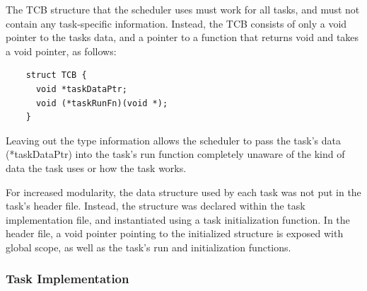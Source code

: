 \documentclass[12pt]{article} %
\begin{document}
    The TCB structure that the scheduler uses must work for all tasks, and must not
    contain any task-specific information. Instead, the TCB consists of only a void pointer to the tasks data, and a pointer to a function that returns void and takes a void pointer, as follows:
    \begin{lstlisting}
    struct TCB {
      void *taskDataPtr;
      void (*taskRunFn)(void *);
    }
    \end{lstlisting}
    Leaving out the type information allows the scheduler to pass the task's data
    (*taskDataPtr) into the task's run function completely unaware of the kind of
    data the task uses or how the task works.

    For increased modularity, the data structure used by each task was not put in
    the task's header file. Instead, the structure was declared within the task
    implementation file, and instantiated using a task initialization function. In
    the header file, a void pointer pointing to the initialized structure is
    exposed with global scope, as well as the task's run and initialization functions.

    \subsubsection{Task Implementation}
\end{document}
